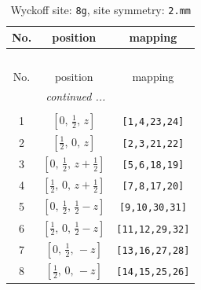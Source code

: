 \documentclass[fleqn,8pt]{jsarticle}
\begin{document}
\begin{longtable}{ccc}
\caption{Wyckoff site: {\tt 8g}, site symmetry: {\tt 2.mm}}
 \\
 \hline \hline
No. & position & mapping \\ \hline \endfirsthead

\multicolumn{2}{l}{\tablename\ \thetable{}} \\
 \hline \hline
No. & position & mapping \\ \hline \endhead

 \hline \hline
\multicolumn{2}{r}{\footnotesize\it continued ...} \\ \endfoot

 \hline \hline
\multicolumn{2}{r}{} \\ \endlastfoot

1 & $\left[ 0,\, \frac{1}{2},\, z \right]$ & {\tt [1,4,23,24]} \\ \hline
2 & $\left[ \frac{1}{2},\, 0,\, z \right]$ & {\tt [2,3,21,22]} \\ \hline
3 & $\left[ 0,\, \frac{1}{2},\, z + \frac{1}{2} \right]$ & {\tt [5,6,18,19]} \\ \hline
4 & $\left[ \frac{1}{2},\, 0,\, z + \frac{1}{2} \right]$ & {\tt [7,8,17,20]} \\ \hline
5 & $\left[ 0,\, \frac{1}{2},\, \frac{1}{2} - z \right]$ & {\tt [9,10,30,31]} \\ \hline
6 & $\left[ \frac{1}{2},\, 0,\, \frac{1}{2} - z \right]$ & {\tt [11,12,29,32]} \\ \hline
7 & $\left[ 0,\, \frac{1}{2},\, - z \right]$ & {\tt [13,16,27,28]} \\ \hline
8 & $\left[ \frac{1}{2},\, 0,\, - z \right]$ & {\tt [14,15,25,26]} \\
\end{longtable}
\renewcommand{\arraystretch}{1.2}
\end{document}
